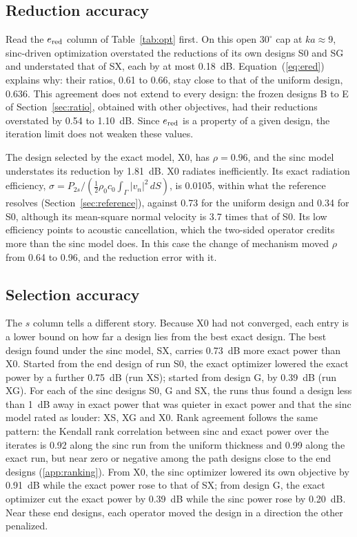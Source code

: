 \documentclass[preprint,12pt]{elsarticle}
\begin{document}
\subsection{Reduction accuracy}
Read the $e_{\rm red}$ column of Table~\ref{tab:opt} first. On this open $30^\circ$ cap at $ka\approx9$, sinc-driven optimization overstated the reductions of its own designs S0 and SG and understated that of SX, each by at most 0.18~dB. %
Equation~(\ref{eq:ered}) explains why: their ratios, 0.61 to 0.66, stay close to that of the uniform design, 0.636. %
This agreement does not extend to every design: the frozen designs B to E of Section~\ref{sec:ratio}, obtained with other objectives, had their reductions overstated by 0.54 to 1.10~dB. Since $e_{\rm red}$ is a property of a given design, the iteration limit does not weaken these values. %

The design selected by the exact model, X0, has $\rho=0.96$, and the sinc model understates its reduction by 1.81~dB. %
X0 radiates inefficiently. Its exact radiation efficiency, $\sigma=P_{2s}/(\tfrac12\rho_0c_0\int_\Gamma|v_n|^2\,dS)$, is 0.0105, within what the reference resolves (Section~\ref{sec:reference}), against 0.73 for the uniform design and 0.34 for S0, although its mean-square normal velocity is 3.7 times that of S0. %
Its low efficiency points to acoustic cancellation, which the two-sided operator credits more than the sinc model does. In this case the change of mechanism moved $\rho$ from 0.64 to 0.96, and the reduction error with it.

\subsection{Selection accuracy}
The $s$ column tells a different story. Because X0 had not converged, each entry is a lower bound on how far a design lies from the best exact design. The best design found under the sinc model, SX, carries 0.73~dB more exact power than X0. %
Started from the end design of run S0, the exact optimizer lowered the exact power by a further 0.75~dB (run XS); started from design G, by 0.39~dB (run XG). %
For each of the sinc designs S0, G and SX, the runs thus found a design less than 1~dB away in exact power that was quieter in exact power and that the sinc model rated as louder: XS, XG and X0. %
Rank agreement follows the same pattern: the Kendall rank correlation between sinc and exact power over the iterates is 0.92 along the sinc run from the uniform thickness and 0.99 along the exact run, but near zero or negative among the path designs close to the end designs (\ref{app:ranking}). %
From X0, the sinc optimizer lowered its own objective by 0.91~dB while the exact power rose to that of SX; from design G, the exact optimizer cut the exact power by 0.39~dB while the sinc power rose by 0.20~dB. Near these end designs, each operator moved the design in a direction the other penalized. %
\end{document}
